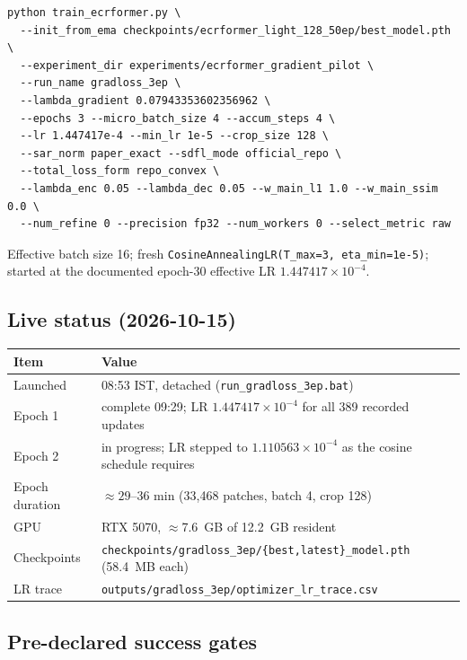 \documentclass[10pt,a4paper]{article}
\newcommand{\code}[1]{\texttt{#1}}
\begin{document}
\begin{lstlisting}
python train_ecrformer.py \
  --init_from_ema checkpoints/ecrformer_light_128_50ep/best_model.pth \
  --experiment_dir experiments/ecrformer_gradient_pilot \
  --run_name gradloss_3ep \
  --lambda_gradient 0.07943353602356962 \
  --epochs 3 --micro_batch_size 4 --accum_steps 4 \
  --lr 1.447417e-4 --min_lr 1e-5 --crop_size 128 \
  --sar_norm paper_exact --sdfl_mode official_repo \
  --total_loss_form repo_convex \
  --lambda_enc 0.05 --lambda_dec 0.05 --w_main_l1 1.0 --w_main_ssim 0.0 \
  --num_refine 0 --precision fp32 --num_workers 0 --select_metric raw
\end{lstlisting}

Effective batch size 16; fresh \code{CosineAnnealingLR(T\_max=3, eta\_min=1e-5)}; started at the
documented epoch-30 effective LR $1.447417\times10^{-4}$.

\subsection{Live status (2026-10-15)}

\begin{center}
\begin{tabular}{@{}ll@{}}
\hline
Item & Value \\
\hline
Launched & 08:53 IST, detached (\code{run\_gradloss\_3ep.bat}) \\
Epoch 1 & complete 09:29; LR $1.447417\times10^{-4}$ for all 389 recorded updates \\
Epoch 2 & in progress; LR stepped to $1.110563\times10^{-4}$ as the cosine schedule requires \\
Epoch duration & $\approx 29$--36 min (33{,}468 patches, batch 4, crop 128) \\
GPU & RTX 5070, $\approx$7.6~GB of 12.2~GB resident \\
Checkpoints & \code{checkpoints/gradloss\_3ep/\{best,latest\}\_model.pth} (58.4~MB each) \\
LR trace & \code{outputs/gradloss\_3ep/optimizer\_lr\_trace.csv} \\
\hline
\end{tabular}
\end{center}

\subsection{Pre-declared success gates}
\end{document}
